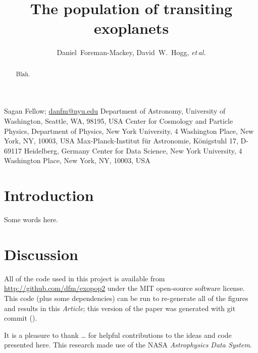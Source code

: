 \documentclass[12pt,preprint]{aastex}
\newcommand{\project}[1]{\textsl{#1}}
\newcommand{\paper}{\textsl{Article}}
\newcommand{\foreign}[1]{\emph{#1}}
\newcommand{\etal}{\foreign{et\,al.}}
\newcommand{\sectlabel}[1]{\label{sect:#1}}
\begin{document}
\title{%
    The population of transiting exoplanets
}

\newcommand{\uw}{2}
\newcommand{\nyu}{3}
\newcommand{\mpia}{4}
\newcommand{\cds}{5}
\author{%
    Daniel~Foreman-Mackey\altaffilmark{1,\uw},
    David~W.~Hogg\altaffilmark{\nyu,\mpia,\cds},
    \etal
}
         {Sagan Fellow; \url{danfm@nyu.edu}}
\altaffiltext{\uw}       {Department of Astronomy, University of Washington,
                          Seattle, WA, 98195, USA}
\altaffiltext{\nyu}      {Center for Cosmology and Particle Physics,
                          Department of Physics, New York University,
                          4 Washington Place, New York, NY, 10003, USA}
\altaffiltext{\mpia}     {Max-Planck-Institut f\"ur Astronomie,
                          K\"onigstuhl 17, D-69117 Heidelberg, Germany}
\altaffiltext{\cds}      {Center for Data Science,
                          New York University,
                          4 Washington Place, New York, NY, 10003, USA}

\begin{abstract}

Blah.

\end{abstract}


\section{Introduction}
\sectlabel{intro}

Some words here.

\citet{Foreman-Mackey:2014}

\section{Discussion}

All of the code used in this project is available from
\url{http://github.com/dfm/exopop2} under the MIT open-source software license.
This code (plus some dependencies) can be run to re-generate all of the
figures and results in this \paper; this version of the paper was generated
with git commit \texttt{\githash} (\gitdate).

\acknowledgments
It is a pleasure to thank
\ldots
for helpful contributions to the ideas and code presented here.
This research made use of the NASA \project{Astrophysics Data System}.
\end{document}
